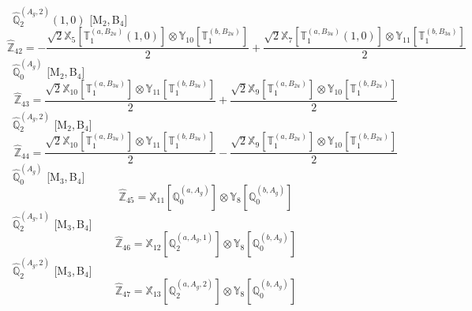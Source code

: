 \documentclass[fleqn,10pt,landscape]{article}
\begin{document}
\begin{itemize}
\begin{dmath*}
\end{dmath*}
\vspace{4mm}
\noindent {} $\,\,\,\hat{\mathbb{Q}}_{2}^{(A_{g},2)}(1,0)$ [M$_{2}$,\,B$_{4}$]
\begin{dmath*}
\hat{\mathbb{Z}}_{42}=- \frac{\sqrt{2} \mathbb{X}_{5}[\mathbb{T}_{1}^{(a,B_{2u})}(1,0)] \otimes\mathbb{Y}_{10}[\mathbb{T}_{1}^{(b,B_{2u})}]}{2} + \frac{\sqrt{2} \mathbb{X}_{7}[\mathbb{T}_{1}^{(a,B_{3u})}(1,0)] \otimes\mathbb{Y}_{11}[\mathbb{T}_{1}^{(b,B_{3u})}]}{2}
\end{dmath*}
\vspace{4mm}
\noindent {} $\,\,\,\hat{\mathbb{Q}}_{0}^{(A_{g})}$ [M$_{2}$,\,B$_{4}$]
\begin{dmath*}
\hat{\mathbb{Z}}_{43}=\frac{\sqrt{2} \mathbb{X}_{10}[\mathbb{T}_{1}^{(a,B_{3u})}] \otimes\mathbb{Y}_{11}[\mathbb{T}_{1}^{(b,B_{3u})}]}{2} + \frac{\sqrt{2} \mathbb{X}_{9}[\mathbb{T}_{1}^{(a,B_{2u})}] \otimes\mathbb{Y}_{10}[\mathbb{T}_{1}^{(b,B_{2u})}]}{2}
\end{dmath*}
\vspace{4mm}
\noindent {} $\,\,\,\hat{\mathbb{Q}}_{2}^{(A_{g},2)}$ [M$_{2}$,\,B$_{4}$]
\begin{dmath*}
\hat{\mathbb{Z}}_{44}=\frac{\sqrt{2} \mathbb{X}_{10}[\mathbb{T}_{1}^{(a,B_{3u})}] \otimes\mathbb{Y}_{11}[\mathbb{T}_{1}^{(b,B_{3u})}]}{2} - \frac{\sqrt{2} \mathbb{X}_{9}[\mathbb{T}_{1}^{(a,B_{2u})}] \otimes\mathbb{Y}_{10}[\mathbb{T}_{1}^{(b,B_{2u})}]}{2}
\end{dmath*}
\vspace{4mm}
\noindent {} $\,\,\,\hat{\mathbb{Q}}_{0}^{(A_{g})}$ [M$_{3}$,\,B$_{4}$]
\begin{dmath*}
\hat{\mathbb{Z}}_{45}=\mathbb{X}_{11}[\mathbb{Q}_{0}^{(a,A_{g})}] \otimes\mathbb{Y}_{8}[\mathbb{Q}_{0}^{(b,A_{g})}]
\end{dmath*}
\vspace{4mm}
\noindent {} $\,\,\,\hat{\mathbb{Q}}_{2}^{(A_{g},1)}$ [M$_{3}$,\,B$_{4}$]
\begin{dmath*}
\hat{\mathbb{Z}}_{46}=\mathbb{X}_{12}[\mathbb{Q}_{2}^{(a,A_{g},1)}] \otimes\mathbb{Y}_{8}[\mathbb{Q}_{0}^{(b,A_{g})}]
\end{dmath*}
\vspace{4mm}
\noindent {} $\,\,\,\hat{\mathbb{Q}}_{2}^{(A_{g},2)}$ [M$_{3}$,\,B$_{4}$]
\begin{dmath*}
\hat{\mathbb{Z}}_{47}=\mathbb{X}_{13}[\mathbb{Q}_{2}^{(a,A_{g},2)}] \otimes\mathbb{Y}_{8}[\mathbb{Q}_{0}^{(b,A_{g})}]

\end{dmath*}
\end{itemize}
\end{document}
